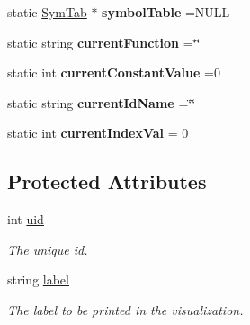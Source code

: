 \begin{DoxyCompactItemize}
\item 
\hypertarget{classAST_a163003bfe9c30510ec8039870346049f}{static \hyperlink{classSymTab}{Sym\-Tab} $\ast$ {\bfseries symbol\-Table} =N\-U\-L\-L}\label{classAST_a163003bfe9c30510ec8039870346049f}

\item 
\hypertarget{classAST_a5c3cc894d9c0453523dec9ed76f18a04}{static string {\bfseries current\-Function} =\char`\"{}\char`\"{}}\label{classAST_a5c3cc894d9c0453523dec9ed76f18a04}

\item 
\hypertarget{classAST_a66155513b59ff1a04c8ece8b20ec31f5}{static int {\bfseries current\-Constant\-Value} =0}\label{classAST_a66155513b59ff1a04c8ece8b20ec31f5}

\item 
\hypertarget{classAST_a3d031d7bab635ba1f015aade5943f40c}{static string {\bfseries current\-Id\-Name} =\char`\"{}\char`\"{}}\label{classAST_a3d031d7bab635ba1f015aade5943f40c}

\item 
\hypertarget{classAST_a16c4b6e54febc1a26b31a64a46972ef0}{static int {\bfseries current\-Index\-Val} = 0}\label{classAST_a16c4b6e54febc1a26b31a64a46972ef0}

\end{DoxyCompactItemize}
\subsection*{Protected Attributes}
\begin{DoxyCompactItemize}
\item 
\hypertarget{classAST_a847b778f1c3dd5a19de32de432ee6e15}{int \hyperlink{classAST_a847b778f1c3dd5a19de32de432ee6e15}{uid}}\label{classAST_a847b778f1c3dd5a19de32de432ee6e15}

\begin{DoxyCompactList}\small\item\em The unique id. \end{DoxyCompactList}\item 
\hypertarget{classAST_ab2e239ccc0688d2341724432ff5a1a31}{string \hyperlink{classAST_ab2e239ccc0688d2341724432ff5a1a31}{label}}\label{classAST_ab2e239ccc0688d2341724432ff5a1a31}

\begin{DoxyCompactList}\small\item\em The label to be printed in the visualization. \end{DoxyCompactList}\end{DoxyCompactItemize}
